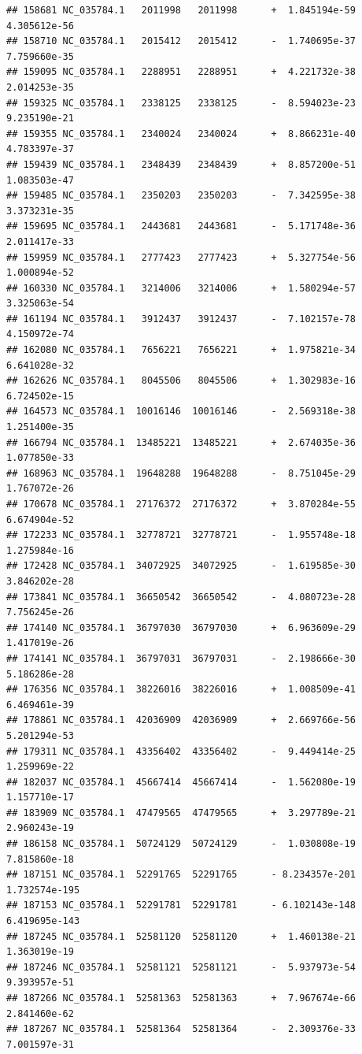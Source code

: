 \documentclass[]{article}
\begin{document}
\begin{verbatim}
## 158681 NC_035784.1   2011998   2011998      +  1.845194e-59  4.305612e-56
## 158710 NC_035784.1   2015412   2015412      -  1.740695e-37  7.759660e-35
## 159095 NC_035784.1   2288951   2288951      +  4.221732e-38  2.014253e-35
## 159325 NC_035784.1   2338125   2338125      -  8.594023e-23  9.235190e-21
## 159355 NC_035784.1   2340024   2340024      +  8.866231e-40  4.783397e-37
## 159439 NC_035784.1   2348439   2348439      +  8.857200e-51  1.083503e-47
## 159485 NC_035784.1   2350203   2350203      -  7.342595e-38  3.373231e-35
## 159695 NC_035784.1   2443681   2443681      -  5.171748e-36  2.011417e-33
## 159959 NC_035784.1   2777423   2777423      +  5.327754e-56  1.000894e-52
## 160330 NC_035784.1   3214006   3214006      +  1.580294e-57  3.325063e-54
## 161194 NC_035784.1   3912437   3912437      -  7.102157e-78  4.150972e-74
## 162080 NC_035784.1   7656221   7656221      +  1.975821e-34  6.641028e-32
## 162626 NC_035784.1   8045506   8045506      +  1.302983e-16  6.724502e-15
## 164573 NC_035784.1  10016146  10016146      -  2.569318e-38  1.251400e-35
## 166794 NC_035784.1  13485221  13485221      +  2.674035e-36  1.077850e-33
## 168963 NC_035784.1  19648288  19648288      -  8.751045e-29  1.767072e-26
## 170678 NC_035784.1  27176372  27176372      +  3.870284e-55  6.674904e-52
## 172233 NC_035784.1  32778721  32778721      -  1.955748e-18  1.275984e-16
## 172428 NC_035784.1  34072925  34072925      -  1.619585e-30  3.846202e-28
## 173841 NC_035784.1  36650542  36650542      -  4.080723e-28  7.756245e-26
## 174140 NC_035784.1  36797030  36797030      +  6.963609e-29  1.417019e-26
## 174141 NC_035784.1  36797031  36797031      -  2.198666e-30  5.186286e-28
## 176356 NC_035784.1  38226016  38226016      +  1.008509e-41  6.469461e-39
## 178861 NC_035784.1  42036909  42036909      +  2.669766e-56  5.201294e-53
## 179311 NC_035784.1  43356402  43356402      -  9.449414e-25  1.259969e-22
## 182037 NC_035784.1  45667414  45667414      -  1.562080e-19  1.157710e-17
## 183909 NC_035784.1  47479565  47479565      +  3.297789e-21  2.960243e-19
## 186158 NC_035784.1  50724129  50724129      -  1.030808e-19  7.815860e-18
## 187151 NC_035784.1  52291765  52291765      - 8.234357e-201 1.732574e-195
## 187153 NC_035784.1  52291781  52291781      - 6.102143e-148 6.419695e-143
## 187245 NC_035784.1  52581120  52581120      +  1.460138e-21  1.363019e-19
## 187246 NC_035784.1  52581121  52581121      -  5.937973e-54  9.393957e-51
## 187266 NC_035784.1  52581363  52581363      +  7.967674e-66  2.841460e-62
## 187267 NC_035784.1  52581364  52581364      -  2.309376e-33  7.001597e-31

\end{verbatim}
\end{document}

